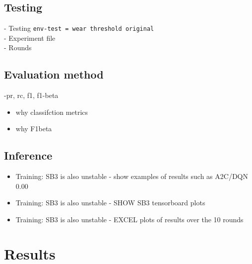 \documentclass[a4paper, 12pt]{article}
\begin{document}
\subsection{Testing}
- Testing \texttt{env-test = wear threshold original}	\\
- Experiment file\\
- Rounds\\

\subsection{Evaluation method}
-pr, rc, f1, f1-beta

\begin{itemize}
	\item why classifction metrics
	\item why F1beta	
\end{itemize}


\subsection{Inference}
\begin{itemize}
	\item Training: SB3 is also unstable - show examples of results such as A2C/DQN 0.00 
	\item Training: SB3 is also unstable - SHOW SB3 tensorboard plots
	\item Training: SB3 is also unstable - EXCEL plots of results over the 10 rounds 	
\end{itemize}




\section{Results}\label{sec:Results}
\end{document}
